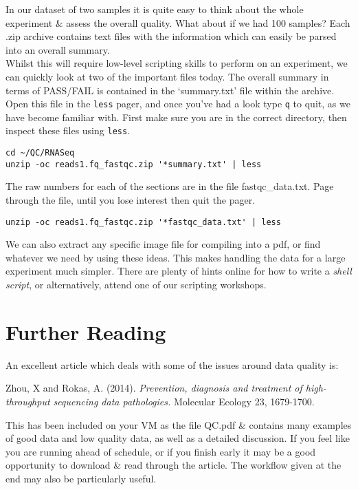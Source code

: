 \begin{advanced}
In our dataset of two samples it is quite easy to think about the whole experiment \& assess the overall quality.
What about if we had 100 samples? 
Each .zip archive contains text files with the information which can easily be parsed into an overall summary. \\

Whilst this will require low-level scripting skills to perform on an experiment, we can quickly look at two of the important files today.
The overall summary in terms of PASS/FAIL is contained in the `summary.txt' file within the archive.
Open this file in the \texttt{less} pager, and once you've had a look type \texttt{q} to quit, as we have become familiar with.
First make sure you are in the correct directory, then inspect these files using \texttt{less}.
\begin{lstlisting}
cd ~/QC/RNASeq
unzip -oc reads1.fq_fastqc.zip '*summary.txt' | less
\end{lstlisting}

The raw numbers for each of the sections are in the file fastqc_data.txt.
Page through the file, until you lose interest then quit the pager.
\begin{lstlisting}
unzip -oc reads1.fq_fastqc.zip '*fastqc_data.txt' | less
\end{lstlisting}

We can also extract any specific image file for compiling into a pdf, or find whatever we need by using these ideas.
This makes handling the data for a large experiment much simpler.
There are plenty of hints online for how to write a \textit{shell script}, or alternatively, attend one of our scripting workshops.
\end{advanced}

\section{Further Reading}
An excellent article which deals with some of the issues around data quality is:

Zhou, X and Rokas, A. (2014). \textit{Prevention, diagnosis and treatment of high-throughput sequencing data pathologies.} Molecular Ecology 23, 1679-1700.

This has been included on your VM as the file QC.pdf \& contains many examples of good data and low quality data, as well as a detailed discussion.
If you feel like you are running ahead of schedule, or if you finish early it may be a good opportunity to download \& read through the article.
The workflow given at the end may also be particularly useful.